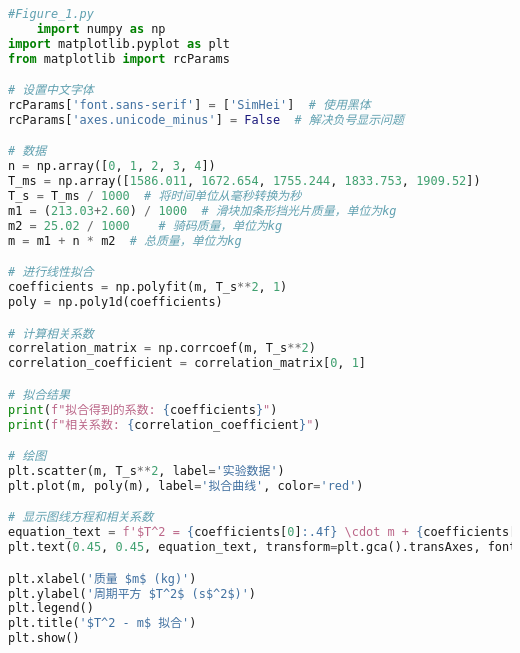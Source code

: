 \documentclass[UTF8]{report}
\theoremstyle{MyLineTheoremStyle} %
\theoremstyle{MyBlockTheoremStyle} %
\theoremstyle{MySubsubsectionStyle} %
\begin{document}
\begin{lstlisting}[language=Python, caption=Figure's Python code, label=code:python_example]
#Figure_1.py
    import numpy as np
import matplotlib.pyplot as plt
from matplotlib import rcParams

# 设置中文字体
rcParams['font.sans-serif'] = ['SimHei']  # 使用黑体
rcParams['axes.unicode_minus'] = False  # 解决负号显示问题

# 数据
n = np.array([0, 1, 2, 3, 4])
T_ms = np.array([1586.011, 1672.654, 1755.244, 1833.753, 1909.52])
T_s = T_ms / 1000  # 将时间单位从毫秒转换为秒
m1 = (213.03+2.60) / 1000  # 滑块加条形挡光片质量，单位为kg
m2 = 25.02 / 1000    # 骑码质量，单位为kg
m = m1 + n * m2  # 总质量，单位为kg

# 进行线性拟合
coefficients = np.polyfit(m, T_s**2, 1)
poly = np.poly1d(coefficients)

# 计算相关系数
correlation_matrix = np.corrcoef(m, T_s**2)
correlation_coefficient = correlation_matrix[0, 1]

# 拟合结果
print(f"拟合得到的系数: {coefficients}")
print(f"相关系数: {correlation_coefficient}")

# 绘图
plt.scatter(m, T_s**2, label='实验数据')
plt.plot(m, poly(m), label='拟合曲线', color='red')

# 显示图线方程和相关系数
equation_text = f'$T^2 = {coefficients[0]:.4f} \cdot m + {coefficients[1]:.4f}$\n相关系数: {correlation_coefficient:.4f}'
plt.text(0.45, 0.45, equation_text, transform=plt.gca().transAxes, fontsize=12, verticalalignment='top')

plt.xlabel('质量 $m$ (kg)')
plt.ylabel('周期平方 $T^2$ (s$^2$)')
plt.legend()
plt.title('$T^2 - m$ 拟合')
plt.show()

\end{lstlisting}










\end{document}
